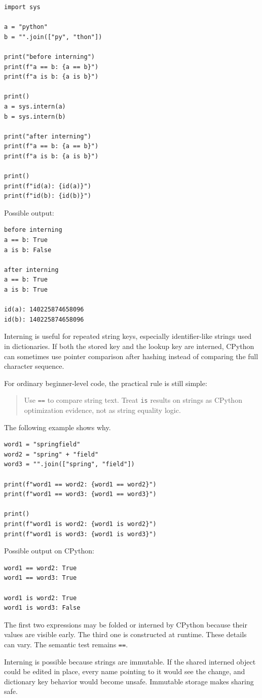 \begin{verbatim}
import sys

a = "python"
b = "".join(["py", "thon"])

print("before interning")
print(f"a == b: {a == b}")
print(f"a is b: {a is b}")

print()
a = sys.intern(a)
b = sys.intern(b)

print("after interning")
print(f"a == b: {a == b}")
print(f"a is b: {a is b}")

print()
print(f"id(a): {id(a)}")
print(f"id(b): {id(b)}")
\end{verbatim}

Possible output:

\begin{verbatim}
before interning
a == b: True
a is b: False

after interning
a == b: True
a is b: True

id(a): 140225874658096
id(b): 140225874658096
\end{verbatim}

Interning is useful for repeated string keys, especially identifier-like strings used in dictionaries. If both the stored key and the lookup key are interned, CPython can sometimes use pointer comparison after hashing instead of comparing the full character sequence.

For ordinary beginner-level code, the practical rule is still simple:

\begin{quote}
Use \texttt{==} to compare string text. Treat \texttt{is} results on strings as CPython optimization evidence, not as string equality logic.
\end{quote}

The following example shows why.

\begin{verbatim}
word1 = "springfield"
word2 = "spring" + "field"
word3 = "".join(["spring", "field"])

print(f"word1 == word2: {word1 == word2}")
print(f"word1 == word3: {word1 == word3}")

print()
print(f"word1 is word2: {word1 is word2}")
print(f"word1 is word3: {word1 is word3}")
\end{verbatim}

Possible output on CPython:

\begin{verbatim}
word1 == word2: True
word1 == word3: True

word1 is word2: True
word1 is word3: False
\end{verbatim}

The first two expressions may be folded or interned by CPython because their values are visible early. The third one is constructed at runtime. These details can vary. The semantic test remains \texttt{==}.

Interning is possible because strings are immutable. If the shared interned object could be edited in place, every name pointing to it would see the change, and dictionary key behavior would become unsafe. Immutable storage makes sharing safe.